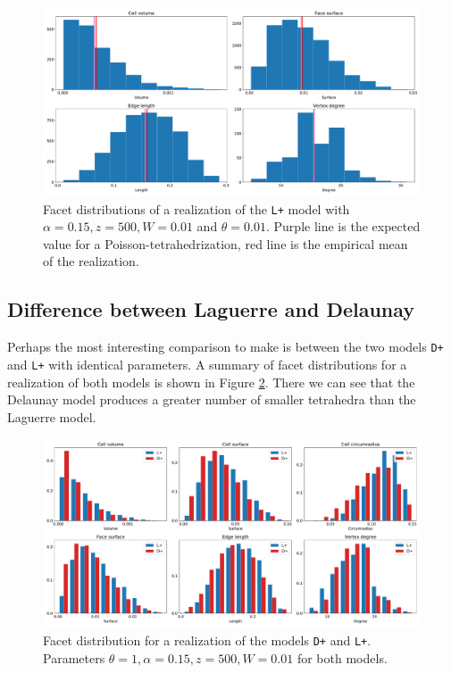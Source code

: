 \begin{figure}
  \centering
    \includegraphics[width=1\textwidth]{../img/numeric/poisson.pdf}
  \caption{Facet distributions of a realization of the \texttt{L+} model with $\alpha=0.15,z=500,W=0.01$ and $\theta = 0.01$. Purple line is the expected value for a Poisson-tetrahedrization, red line is the empirical mean of the realization.  }
  \label{fig:PoisvsGibbs}
\end{figure}




\subsection{Difference between Laguerre and Delaunay}
Perhaps the most interesting comparison to make is between the two models \texttt{D+} and \texttt{L+} with identical parameters. A summary of facet distributions for a realization of both models is shown in Figure  \ref{fig:DelvsLag}. There we can see that the Delaunay model produces a greater number of smaller tetrahedra than the Laguerre model. 


\begin{figure}
  \centering
    \includegraphics[width=1\textwidth]{../img/numeric/facets_L+_D+.pdf}
  \caption{Facet distribution for a realization of the models \texttt{D+} and \texttt{L+}. Parameters $\theta = 1,\alpha = 0.15, z=500, W=0.01$ for both models.}
  \label{fig:DelvsLag}
\end{figure}


